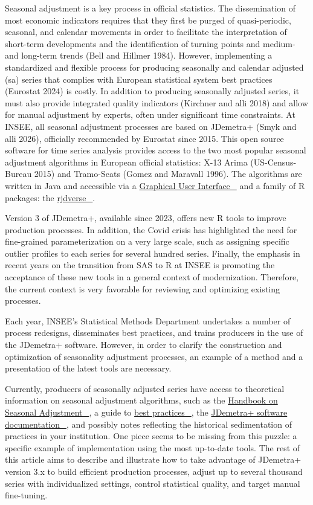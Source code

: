 \documentclass[
  letterpaper,
  DIV=11,
  numbers=noendperiod]{scrreprt}
\begin{document}
Seasonal adjustment is a key process in official statistics. The
dissemination of most economic indicators requires that they first be
purged of quasi-periodic, seasonal, and calendar movements in order to
facilitate the interpretation of short-term developments and the
identification of turning points and medium- and long-term trends (Bell
and Hillmer 1984). However, implementing a standardized and flexible
process for producing seasonally and calendar adjusted (sa) series that
complies with European statistical system best practices (Eurostat 2024)
is costly. In addition to producing seasonally adjusted series, it must
also provide integrated quality indicators (Kirchner and alli 2018) and
allow for manual adjustment by experts, often under significant time
constraints. At INSEE, all seasonal adjustment processes are based on
JDemetra+ (Smyk and alli 2026), officially recommended by Eurostat since
2015. This open source software for time series analysis provides access
to the two most popular seasonal adjustment algorithms in European
official statistics: X-13 Arima (US-Census-Bureau 2015) and Tramo-Seats
(Gomez and Maravall 1996). The algorithms are written in Java and
accessible via a \href{https://github.com/jdemetra}{Graphical User
Interface~🔗} and a family of R packages: the
\href{https://github.com/rjdverse}{rjdverse~🔗}.

Version 3 of JDemetra+, available since 2023, offers new R tools to
improve production processes. In addition, the Covid crisis has
highlighted the need for fine-grained parameterization on a very large
scale, such as assigning specific outlier profiles to each series for
several hundred series. Finally, the emphasis in recent years on the
transition from SAS to R at INSEE is promoting the acceptance of these
new tools in a general context of modernization. Therefore, the current
context is very favorable for reviewing and optimizing existing
processes.

Each year, INSEE's Statistical Methods Department undertakes a number of
process redesigns, disseminates best practices, and trains producers in
the use of the JDemetra+ software. However, in order to clarify the
construction and optimization of seasonality adjustment processes, an
example of a method and a presentation of the latest tools are
necessary.

Currently, producers of seasonally adjusted series have access to
theoretical information on seasonal adjustment algorithms, such as the
\href{https://ec.europa.eu/eurostat/web/products-manuals-and-guidelines/-/ks-gq\%20-18-001}{Handbook
on Seasonal Adjustment~🔗}, a guide to
\href{https://ec.europa.eu/eurostat/web/products-manuals-and-guidelines/w/ks-gq\%20-24-012}{best
practices~🔗}, the \href{https://doc.jdemetra.org/}{JDemetra+ software
documentation~🔗}, and possibly notes reflecting the historical
sedimentation of practices in your institution. One piece seems to be
missing from this puzzle: a specific example of implementation using the
most up-to-date tools. The rest of this article aims to describe and
illustrate how to take advantage of JDemetra+ version 3.x to build
efficient production processes, adjust up to several thousand series
with individualized settings, control statistical quality, and target
manual fine-tuning.
\end{document}
